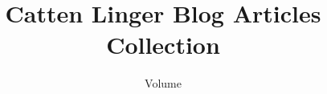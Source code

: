 \newcommand{\leftpadnumber}[1]{#1}
\newcommand{\chaptertitlefont}[0]{\rmfamily\LARGE\mdseries}



\setlength{\parskip}{0.5em}
\setlength{\parindent}{0em}

\setcounter{secnumdepth}{0}



\title{Catten Linger Blog Articles Collection}
\author{Volume \volid}

\newcommand{\leftpad}[1]{#1}


\newcommand{\iarttag}[1]{#1\hskip 0.75em}
\newcommand{\iartcat}[1]{#1\hskip 0.75em}

\newcommand{\iarticle}[4]{
    \clearpage
    \phantomsection
    \begin{minipage}{\linewidth}
        \chaptertitlefont
        \myvphantom#2\par\vskip 10pt
        \small
        \ttfamily
        \parbox{\linewidth}{\myvphantom 日期：#1}
    \end{minipage}\par
    \vskip 15pt
    \hrule
    \vskip 40pt
    \stepcounter{chapter}
    \addcontentsline{toc}{chapter}{\numberline{\arabic{chapter}}#2}
}

\newcommand{\anchorTextColor}[1]{%
    \textcolor{blue!80!green}{#1}%
}
\newcommand{\inlinehref}[2]{%
    \phantomleadingspace%
    {\anchorTextColor{%
        \href{#1}{#2}%
    }}%
    \phantomleadingspace%
    \footnote{URL: \href{#1}{#1}}%
    \phantomleadingspace%
}
\newcommand{\reflistitem}[2]{%
    \item \href{#1}{\raggedright#2\\\fontsize{8pt}{9.5pt}\ttfamily\anchorTextColor{#1}}%
}
\newcommand{\articlereflist}[1]{
    \vskip 30pt
    \vfill
    \begin{minipage}{\linewidth}
        参考资料\par
        \begin{compactitem}\small
            #1
        \end{compactitem}
    \end{minipage}
}

\newcommand{\phantomleadingspace}[0]{%
    \ifhmode%
        \hskip 7pt plus 15pt%
    \fi%
}
\newcommand{\icode}[1]{%
    \phantomleadingspace%
    \texttt{\small\textcolor{red!60!black}{#1}}%
    \hskip 5pt plus 20pt%
}

